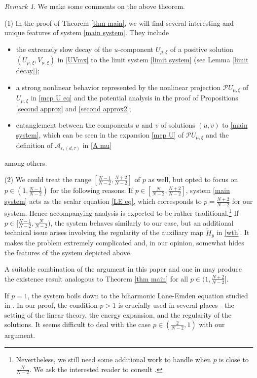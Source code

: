 \documentclass[reqno]{amsart}
\theoremstyle{remark}
\newtheorem{remark}[theorem]{Remark}
\newcommand{\ep}{\epsilon}
\newcommand{\mca}{\mathcal{A}}
\newcommand{\mcp}{\mathcal{P}}
\newcommand{\wth}{\widetilde{H}}
\newcommand{\mx}{{\mu,\xi}}
\renewcommand{\(}{\left(}
\renewcommand{\)}{\right)}
\numberwithin{equation}{section}
\begin{document}
\begin{remark}\label{main rmk}
We make some comments on the above theorem.

\medskip \noindent (1) In the proof of Theorem \ref{thm main}, we will find several interesting and unique features of system \eqref{main system}. They include
\begin{itemize}
\item[-] the extremely slow decay of the $u$-component $U_\mx$ of a positive solution $(U_\mx,V_\mx)$ in \eqref{UVmx} to the limit system \eqref{limit system} (see Lemma \ref{limit decay});
\item[-] a strong nonlinear behavior represented by the nonlinear projection $\mcp U_\mx$ of $U_\mx$ in \eqref{mcp U eq} and the potential analysis in the proof of Propositions \ref{second approx} and \ref{second approx2};
\item[-] entanglement between the components $u$ and $v$ of solutions $(u,v)$ to \eqref{main system}, which can be seen in the expansion \eqref{mcp U} of $\mcp U_\mx$ and the definition of $\mca_{\ep,(d,\tau)}$ in \eqref{A mu}
\end{itemize}
among others.

\medskip \noindent (2) We could treat the range $[\frac{N-1}{N-2},\frac{N+2}{N-2}]$ of $p$ as well, but opted to focus on $p \in (1,\frac{N-1}{N-2})$ for the following reasons:
If $p \in [\frac{N}{N-2},\frac{N+2}{N-2}]$, system \eqref{main system} acts as the scalar equation \eqref{LE eq}, which corresponds to $p=\frac{N+2}{N-2}$ for our system. Hence accompanying analysis is expected to be rather traditional.\footnote{Nevertheless,
we still need some additional work to handle when $p$ is close to $\frac{N}{N-2}$. We ask the interested reader to consult \cite[Subsections 5.1, 5.2]{KM}.}
If $p \in [\frac{N-1}{N-2},\frac{N}{N-2})$, the system behaves similarly to our case, but an additional technical issue arises involving the regularity of the auxiliary map $\wth_y$ in \eqref{wth}.
It makes the problem extremely complicated and, in our opinion, somewhat hides the features of the system depicted above.

A suitable combination of the argument in this paper and one in \cite[Section 5]{KM} may produce the existence result analogous to Theorem \ref{thm main} for all $p \in (1,\frac{N+2}{N-2}]$.

If $p = 1$, the system boils down to the biharmonic Lane-Emden equation studied in \cite{AP}.
In our proof, the condition $p > 1$ is crucially used in several places - the setting of the linear theory, the energy expansion, and the regularity of the solutions.
It seems difficult to deal with the case $p \in (\frac{2}{N-2},1)$ with our argument.


\end{remark}
\end{document}
